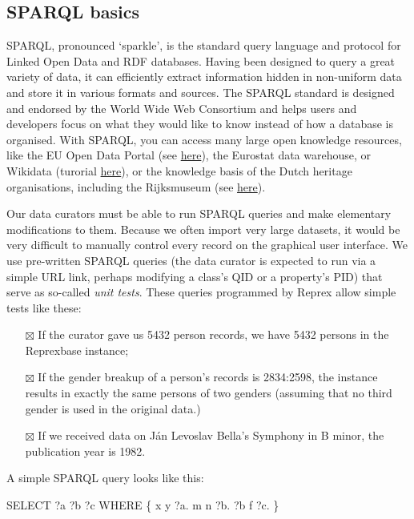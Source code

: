 \documentclass[
  letterpaper,
  DIV=11,
  numbers=noendperiod]{scrreprt}
\newenvironment{Shaded}{\begin{snugshade}}{\end{snugshade}}
\newcommand{\NormalTok}[1]{\textcolor[rgb]{0.00,0.23,0.31}{#1}}
\providecommand{\tightlist}{%
  \setlength{\itemsep}{0pt}\setlength{\parskip}{0pt}}\usepackage{longtable,booktabs,array}
\begin{document}
\subsection{SPARQL basics}\label{sec-sparql}

SPARQL, pronounced `sparkle', is the standard query language and
protocol for Linked Open Data and RDF databases. Having been designed to
query a great variety of data, it can efficiently extract information
hidden in non-uniform data and store it in various formats and sources.
The SPARQL standard is designed and endorsed by the World Wide Web
Consortium and helps users and developers focus on what they would like
to know instead of how a database is organised. With SPARQL, you can
access many large open knowledge resources, like the EU Open Data Portal
(see \href{https://data.europa.eu/data/sparql?locale=en}{here}), the
Eurostat data warehouse, or Wikidata (turorial
\href{https://www.wikidata.org/wiki/Wikidata:SPARQL_tutorial}{here}), or
the knowledge basis of the Dutch heritage organisations, including the
Rijksmuseum (see
\href{https://data.netwerkdigitaalerfgoed.nl/Rijksmuseum/collection/sparql}{here}).

Our data curators must be able to run SPARQL queries and make elementary
modifications to them. Because we often import very large datasets, it
would be very difficult to manually control every record on the
graphical user interface. We use pre-written SPARQL queries (the data
curator is expected to run via a simple URL link, perhaps modifying a
class's QID or a property's PID) that serve as so-called \emph{unit
tests}. These queries programmed by Reprex allow simple tests like
these:

\begin{itemize}
\tightlist
\item[$\boxtimes$]
  If the curator gave us 5432 person records, we have 5432 persons in
  the Reprexbase instance;
\item[$\boxtimes$]
  If the gender breakup of a person's records is 2834:2598, the instance
  results in exactly the same persons of two genders (assuming that no
  third gender is used in the original data.)
\item[$\boxtimes$]
  If we received data on Ján Levoslav Bella's Symphony in B minor, the
  publication year is 1982.
\end{itemize}

A simple SPARQL query looks like this:

\begin{Shaded}
\begin{Highlighting}[]
\NormalTok{SELECT ?a ?b ?c}
\NormalTok{WHERE}
\NormalTok{\{}
\NormalTok{  x y ?a.}
\NormalTok{  m n ?b.}
\NormalTok{  ?b f ?c.}
\NormalTok{\}}
\end{Highlighting}
\end{Shaded}
\end{document}
